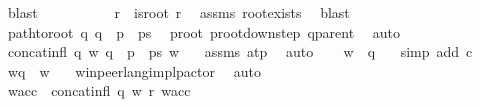 \begin{isabellebody}
\ blast\isanewline
\ \ \ \ \ \ \isanewline
\ \ \isamarkupfalse%
\ r\ \ {\isachardoublequoteopen}is{\isacharunderscore}{\kern0pt}root\ r{\isachardoublequoteclose}\ \isamarkupfalse%
\ assms{\isacharparenleft}{\kern0pt}{}{\isacharparenright}{\kern0pt}\ root{\isacharunderscore}{\kern0pt}exists\ \isamarkupfalse%
\ blast\isanewline
\ \ \isamarkupfalse%
\ {\isachardoublequoteopen}path{\isacharunderscore}{\kern0pt}to{\isacharunderscore}{\kern0pt}root\ q\ {\isacharparenleft}{\kern0pt}q\ {\isacharhash}{\kern0pt}\ p\ {\isacharhash}{\kern0pt}\ ps{\isacharparenright}{\kern0pt}{\isachardoublequoteclose}\ \isamarkupfalse%
\ p{}root\ p{}root{\isacharunderscore}{\kern0pt}down{\isacharunderscore}{\kern0pt}step\ q{\isacharunderscore}{\kern0pt}parent\ \isamarkupfalse%
\ auto\isanewline
\ \ \isamarkupfalse%
\ \isamarkupfalse%
\ {\isachardoublequoteopen}concat{\isacharunderscore}{\kern0pt}infl\ q\ w\ {\isacharparenleft}{\kern0pt}q\ {\isacharhash}{\kern0pt}\ p\ {\isacharhash}{\kern0pt}\ ps{\isacharparenright}{\kern0pt}\ w{\isachardoublequoteclose}\ \ \isamarkupfalse%
\ assms{\isacharparenleft}{\kern0pt}{}{\isacharcomma}{\kern0pt}{}{\isacharparenright}{\kern0pt}\ at{\isacharunderscore}{\kern0pt}p\ \isamarkupfalse%
\ auto\isanewline
\ \ \isamarkupfalse%
\ {\isachardoublequoteopen}w\ {\isasymin}\ {\isasymL}{\isacharparenleft}{\kern0pt}q{\isacharparenright}{\kern0pt}{\isachardoublequoteclose}\ \ \isamarkupfalse%
\ {\isacharparenleft}{\kern0pt}simp\ add{\isacharcolon}{\kern0pt}\ c{}{\isacharparenright}{\kern0pt}\isanewline
\ \ \isamarkupfalse%
\ \isamarkupfalse%
\ {\isachardoublequoteopen}w{\isasymdown}\isactrlsub q\ {\isacharequal}{\kern0pt}\ w{\isachardoublequoteclose}\ \ \isamarkupfalse%
\ w{\isacharunderscore}{\kern0pt}in{\isacharunderscore}{\kern0pt}peer{\isacharunderscore}{\kern0pt}lang{\isacharunderscore}{\kern0pt}impl{\isacharunderscore}{\kern0pt}p{\isacharunderscore}{\kern0pt}actor\ \isamarkupfalse%
\ auto\isanewline
\ \ \ \ \ \ \isanewline
\ \ \ \ \ \ \isanewline
\ \ \ \ \ \ \isanewline
\ \ \isamarkupfalse%
\ w{\isacharunderscore}{\kern0pt}acc\ \ {\isachardoublequoteopen}concat{\isacharunderscore}{\kern0pt}infl\ q\ w\ {\isacharbrackleft}{\kern0pt}r{\isacharbrackright}{\kern0pt}\ w{\isacharunderscore}{\kern0pt}acc{\isachardoublequoteclose}\ \isamarkupfalse%

\end{isabellebody}
